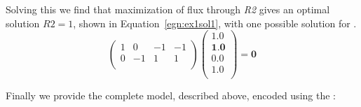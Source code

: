 %
%
Solving this we find that maximization of flux through \textit{R2}
gives an optimal solution $R2 = 1$, shown in Equation~\ref{egn:ex1sol1}, with one possible solution
for \Jvec.
\begin{equation}\label{egn:ex1sol1}
  \left(
    \begin{array}{cccc}
        1 &  0 & -1 & -1 \\
        0 & -1 &  1 &  1 \\
    \end{array}
  \right)
  \left(
    \begin{array}{c}
        1.0 \\
        \textbf{1.0} \\
        0.0 \\
        1.0 \\
    \end{array}
  \right)
  = \textbf{0}
\end{equation}

Finally we provide the complete model, described above, encoded using the \FBCPackage:
%
